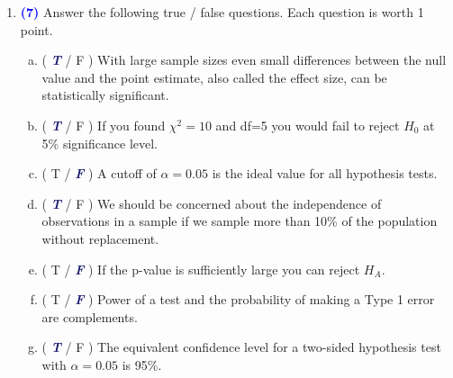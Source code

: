 \documentclass[11pt]{article}
\newcommand{\solnMult}[1]{\textbf{\textcolor{MidnightBlue}{\textit{#1}}}}	%
\newcommand{\pts}[1]{ \textbf{{\footnotesize \textcolor{blue}{(#1)}}} }	%
\begin{document}
\begin{enumerate}
%

\vspace{2cm}

\item \pts{7} Answer the following true / false questions. Each question is worth 1 point.
\begin{enumerate}[(a)]
\vspace{3mm} \item ( \solnMult{T} / F ) With large sample sizes even small differences between the null value and the point estimate, also called the effect size, can be statistically significant.
\vspace{3mm} \item ( \solnMult{T} / F ) If you found $\chi^2=10$ and df=5 you would fail to reject $H_0$ at 5\% significance level.
\vspace{3mm} \item ( T / \solnMult{F} ) A cutoff of $\alpha = 0.05$ is the ideal value for all hypothesis tests.
\vspace{3mm} \item ( \solnMult{T} / F ) We should be concerned about the independence of observations in a sample if we sample more than 10\% of the population without replacement.
\vspace{3mm} \item ( T / \solnMult{F} ) If the p-value is sufficiently large you can reject $H_A$.
\vspace{3mm} \item ( T / \solnMult{F} ) Power of a test and the probability of making a Type 1 error are complements.
\vspace{3mm} \item ( \solnMult{T} / F ) The equivalent confidence level for a two-sided hypothesis test with $\alpha = 0.05$ is 95\%.
\vspace{10mm}
\end{enumerate}

\end{enumerate}
%
%
\end{document}
